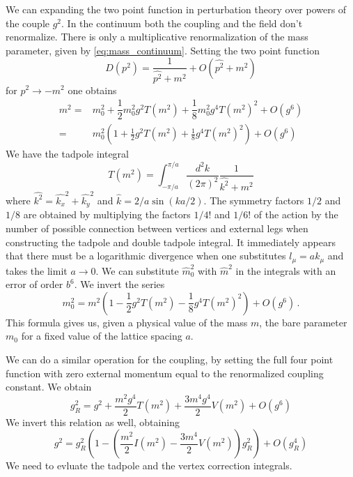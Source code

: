 \documentclass[12pt,a4paper]{report}
\begin{document}
  We can expanding the two point function in perturbation theory over powers of the couple $g^2$. In the continuum both the coupling and the field don't renormalize. There is only a multiplicative renormalization of the mass parameter, given by \eqref{eq:mass_continuum}. Setting the two point function \begin{equation}
  D(p^2) = \dfrac{1}{\hat{p^2}+ m^2} +O(\hat{p^2} +m^2)
\end{equation}  for $p^2 \to -m^2$ one obtains \begin{align}
\label{eq:renormalisedmass}
  m^2=&   m_0^2  +\dfrac{1}{2}   m_0^2 g^2 T( m^2)+ \dfrac{1}{8}  m_0^2 g^4 T( m^2)^2 + O(g^6) \\
 = &  m_0^2 (1 + \frac{1}{2}g^2 T( m^2) + \frac{1}{8} g^4 T( m^2)^2 ) + O(g^6 )
 \end{align} We have  the tadpole integral \begin{equation}
 \label{eq:tadpole}
 T(m^2) = \int_{-\pi/a}^{\pi/a} \dfrac{d^2k}{(2 \pi)^2} \dfrac{1}{\hat{k^2} + m^2
  }
 \end{equation} where $\hat{k^2} = \hat{k_x}^2 + \hat{k_y}^2$ and $\hat k = 2/a \sin (ka/2)$. The symmetry factors $1/2$ and $1/8$ are obtained by multiplying the factors $1/4!$ and $1/6!$ of the action by the number of possible connection between vertices and external legs when constructing the tadpole and double tadpole integral.
 It immediately appears that there must be a logarithmic divergence when one substitutes $l_\mu = a k_\mu$ and takes the limit $a\to 0$. 
 We can substitute $\hat m_0^2$ with $\hat m^2$ in the integrals with an error of order $b^6$. We invert the series \begin{equation}
  m_0^2 =  m^2(1 - \frac{1}{2}g^2 T(  m^2) - \frac{1}{8} g^4 T(m^2)^2 ) + O( g^6 ) \,.
 \end{equation} This formula gives us, given a physical value of the mass $m$, the bare parameter $m_0$ for a fixed value of the lattice spacing $a$. 
 
 We can do a similar operation for the coupling, by setting the full four point function with zero external momentum equal to the renormalized coupling constant. We obtain \begin{equation}
 g_R^2 = g^2 +\dfrac{m^2 g^4}{2} T(m^2) + \dfrac{3 m^4 g^4}{2} V(m^2) + O(g^6)
\end{equation} We invert this relation as well, obtaining \begin{equation}
g^2 = g_R^2(1- (\dfrac{m^2}{2}I(m^2) - \dfrac{3m^4}{2}V(m^2) )g_R^2) + O(g_R^4)
\end{equation} We need to evluate the tadpole and the vertex correction integrals.
  
\end{document}

